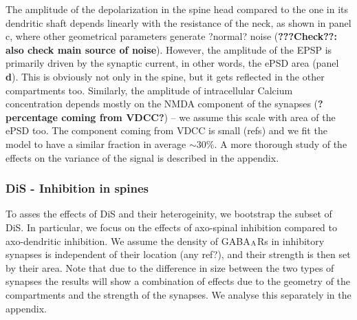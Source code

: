 \documentclass[10pt,letterpaper]{article}
\begin{document}
The amplitude of the depolarization in the spine head compared to the one in its dendritic shaft depends linearly with the resistance of the neck, as shown in panel c, where other geometrical parameters generate ?normal? noise ({\bf ???Check??: also check main source of noise}). However, the amplitude of the EPSP is primarily driven by the synaptic current, in other words, the ePSD area (panel {\bf d}). This is obviously not only in the spine, but it  gets reflected in the other compartments too. 
Similarly, the amplitude of intracellular Calcium concentration depends mostly on the NMDA component of the synapses ({\bf ?percentage coming from VDCC?}) -- we assume this scale with area of the ePSD too. The component coming from VDCC is small (refs) and we fit the model to have a similar fraction in average $\sim 30\%$. A more thorough study of the effects on the variance of the signal is described in the appendix.






\subsubsection*{DiS - Inhibition in spines}

To asses the effects of DiS and their heterogeinity, we bootstrap the subset of DiS.
In particular, we focus on the effects of axo-spinal inhibition compared to axo-dendritic inhibition. We assume the density of GABA$_{\rm A}$Rs in inhibitory synapses is independent of their location (any ref?), and their strength is then set by their area. Note that due to the difference in size between the two types of synapses the results will show a combination of effects due to the geometry of the compartments and the strength of the synapses. We analyse this separately in the appendix.
\end{document}
